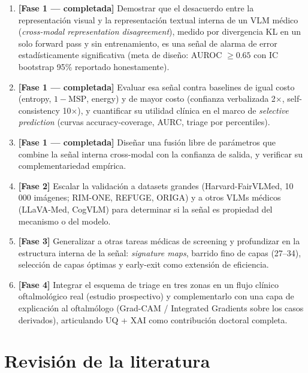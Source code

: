 \documentclass[12pt,a4paper]{article}
\begin{document}
\begin{enumerate}[leftmargin=1.6em]
    \item \textbf{[Fase 1 --- completada]} Demostrar que el desacuerdo
    entre la representación visual y la representación textual interna de
    un VLM médico (\emph{cross-modal representation disagreement}), medido
    por divergencia KL en un solo forward pass y sin entrenamiento, es una
    señal de alarma de error estadísticamente significativa (meta de
    diseño: AUROC $\geq 0.65$ con IC bootstrap 95\% reportado
    honestamente).
    \item \textbf{[Fase 1 --- completada]} Evaluar esa señal contra
    baselines de igual costo (entropy, $1-\mathrm{MSP}$, energy) y de
    mayor costo (confianza verbalizada 2$\times$, self-consistency
    10$\times$), y cuantificar su utilidad clínica en el marco de
    \emph{selective prediction} (curvas accuracy-coverage, AURC, triage
    por percentiles).
    \item \textbf{[Fase 1 --- completada]} Diseñar una fusión libre de
    parámetros que combine la señal interna cross-modal con la confianza
    de salida, y verificar su complementariedad empírica.
    \item \textbf{[Fase 2]} Escalar la validación a datasets grandes
    (Harvard-FairVLMed, 10\,000 imágenes; RIM-ONE, REFUGE, ORIGA) y a
    otros VLMs médicos (LLaVA-Med, CogVLM) para determinar si la señal es
    propiedad del mecanismo o del modelo.
    \item \textbf{[Fase 3]} Generalizar a otras tareas médicas de
    screening y profundizar en la estructura interna de la señal:
    \emph{signature maps}, barrido fino de capas (27--34), selección de
    capas óptimas y early-exit como extensión de eficiencia.
    \item \textbf{[Fase 4]} Integrar el esquema de triage en tres zonas en
    un flujo clínico oftalmológico real (estudio prospectivo) y
    complementarlo con una capa de explicación al oftalmólogo (Grad-CAM /
    Integrated Gradients sobre los casos derivados), articulando UQ + XAI
    como contribución doctoral completa.
\end{enumerate}

\section{Revisión de la literatura}
\end{document}
